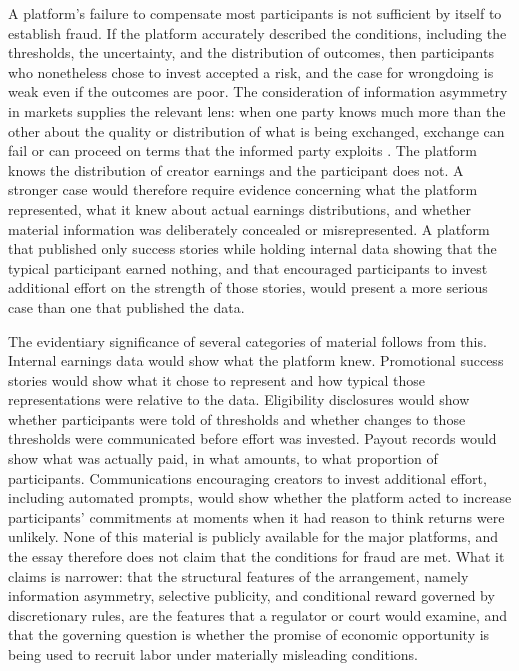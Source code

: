 \documentclass[11pt]{article}
\theoremstyle{remark}
\begin{document}
A platform's failure to compensate most participants is not sufficient by itself to establish fraud. If the platform accurately described the conditions, including the thresholds, the uncertainty, and the distribution of outcomes, then participants who nonetheless chose to invest accepted a risk, and the case for wrongdoing is weak even if the outcomes are poor. The consideration of information asymmetry in markets supplies the relevant lens: when one party knows much more than the other about the quality or distribution of what is being exchanged, exchange can fail or can proceed on terms that the informed party exploits \cite{akerlof1970}. The platform knows the distribution of creator earnings and the participant does not. A stronger case would therefore require evidence concerning what the platform represented, what it knew about actual earnings distributions, and whether material information was deliberately concealed or misrepresented. A platform that published only success stories while holding internal data showing that the typical participant earned nothing, and that encouraged participants to invest additional effort on the strength of those stories, would present a more serious case than one that published the data.

The evidentiary significance of several categories of material follows from this. Internal earnings data would show what the platform knew. Promotional success stories would show what it chose to represent and how typical those representations were relative to the data. Eligibility disclosures would show whether participants were told of thresholds and whether changes to those thresholds were communicated before effort was invested. Payout records would show what was actually paid, in what amounts, to what proportion of participants. Communications encouraging creators to invest additional effort, including automated prompts, would show whether the platform acted to increase participants' commitments at moments when it had reason to think returns were unlikely. None of this material is publicly available for the major platforms, and the essay therefore does not claim that the conditions for fraud are met. What it claims is narrower: that the structural features of the arrangement, namely information asymmetry, selective publicity, and conditional reward governed by discretionary rules, are the features that a regulator or court would examine, and that the governing question is whether the promise of economic opportunity is being used to recruit labor under materially misleading conditions.
\end{document}
